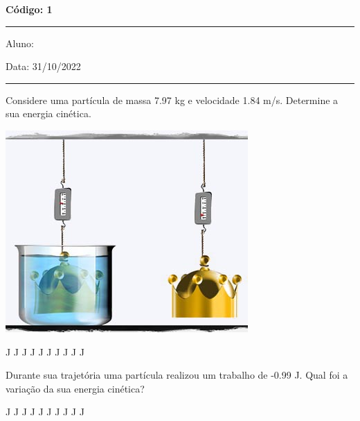 \documentclass[12pt, addpoints]{exam}
\begin{document}
        \begin{minipage}[r]{0.20\linewidth}
            \begin{flushright}
                {\bf \Large Código: 1}
            \end{flushright}
        \end{minipage}
        \vspace{0.5cm} \hrule \vspace{0.5cm}
        \begin{minipage}{0.75\linewidth}
            Aluno:
        \end{minipage}
        \begin{minipage}{0.20\linewidth}
            Data: 31/10/2022
        \end{minipage}
        \vspace{0.5cm} \hrule \vspace{0.5cm}

        \begin{questions}
\begin{multicols*}{2}
\question[33] Considere uma partícula de massa    7.97 kg e velocidade    1.84 m/s. Determine a sua energia cinética.
\begin{center}
\begin{minipage}[c]{0.75\linewidth}
\includegraphics[width=\textwidth]{MWE001.jpg}
\end{minipage}
\end{center}
\begin{oneparchoices}
 J J J J J J J J J J\end{oneparchoices}
\question[23] Durante sua trajetória uma partícula realizou um trabalho de   -0.99 J. Qual foi a variação da sua energia cinética?
\begin{oneparchoices}
 J J J J J J J J J J\end{oneparchoices}
\end{multicols*}
\end{questions}
\newpage
\end{document}
